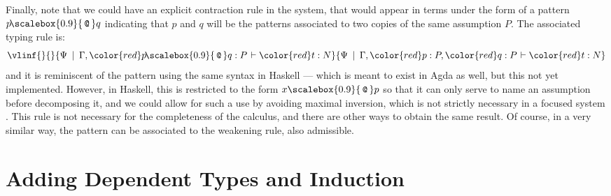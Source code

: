 \documentclass[creativecommons]{eptcs/eptcs}
\makeatletter
\newcommand{\rnm}[1]{\textbf{\textit{#1}}}
\newcommand{\mmid}{\:\mid\:}
\newcommand{\gseq}[2]{{#1 \hspace*{1pt}\vdash #2}}
\newcommand{\pcp}[0]{\mathord{\scalebox{0.9}{\texttt{\,@\,}}}\xspace}
\newcommand{\trm}[1]{{\color{red} #1}}
\newcommand{\irule}[3]{
  \vlinf{\rnm{#1}}{}{#2}{#3}}
\newcommand{\gseqrule}[5]{
  \irule{#1}{\gseq{#2}{#3}}{\gseq{#4}{#5}}}
\makeatother
\begin{document}
Finally, note that we could have an explicit contraction rule in the system,
that would appear in terms under the form of a pattern $p \!\pcp q$ indicating
that $p$ and $q$ will be the patterns associated to two copies of the same
assumption $P$. The associated typing rule is:
$$\gseqrule{}{\Psi \mmid \Gamma,\trm{p \!\pcp q}:P}{\trm{t}:N}
    {\Psi \mmid \Gamma,\trm{p}:P,\trm{q}:P}{\trm{t}:N}$$
and it is reminiscent of the pattern using the same syntax in Haskell ---
which is meant to exist in Agda as well, but this not yet implemented. However,
in Haskell, this is restricted to the form $x \pcp p$ so that it can only
serve to name an assumption before decomposing it, and we could allow for
such a use by avoiding maximal inversion, which is not strictly necessary
in a focused system \cite{brockn:guenot:gustafsson:15:ljfoc}. This rule is
not necessary for the completeness of the calculus, and there are other ways
to obtain the same result. Of course, in a very similar way, the pattern
\raisebox{0.1em}{$\texttt{\_}$} can be associated to the weakening rule,
also admissible.

\newpage



\section{Adding Dependent Types and Induction}
\label{sec:depind}
\end{document}
